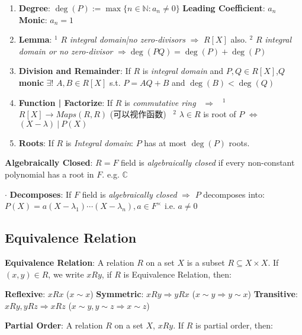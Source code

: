 \documentclass[9pt]{article}
\begin{document}
\begin{enumerate}[itemsep=-2pt, topsep=-2pt]
    \item \textbf{Degree}: $\deg(P):=\max\{n\in\mathbb{N}:a_n\ne0\}$ \quad \textbf{Leading Coefficient}: $a_n$ \quad \textbf{Monic}: $a_n=1$ \quad \quad {}
    \item \textbf{Lemma}: {\small $^1$ $R$ \textit{integral domain|no zero-divisors} $\Rightarrow$ $R[X]$ also. \qquad $^2$ $R$ \textit{integral domain or no zero-divisor} $\Rightarrow\deg(PQ)=\deg(P)+\deg(P)$}
    \item \textbf{Division and Remainder}: If $R$ is \textit{integral domain} and $P,Q\in R[X]$,{\scriptsize $Q$ \textbf{monic}} $\exists!$ $A,B\in R[X]$ s.t. $P=AQ+B$ and $\deg(B)<\deg(Q)$
    \item \textbf{Function | Factorize}: If $R$ is \textit{commutative ring} \ $\Rightarrow$ \ $^1$ $R[X]\to Maps(R,R)$ {\scriptsize (可以视作函数)} \ $^2$ $\lambda\in R$ is root of $P$ $\Leftrightarrow$ $(X-\lambda) \ | \ P(X)$
    \item \textbf{Roots}: If $R$ is \textit{Integral domain}: $P$ has at most $\deg(P)$ roots.
\end{enumerate}

\textbf{Algebraically Closed}: $R=F$ field is \textit{algebraically closed} if every non-constant polynomial has a root in $F$. \qquad \qquad e.g. $\mathbb{C}$

$\cdot$ \textbf{Decomposes}: If $F$ field is \textit{algebraically closed} $\Rightarrow$ $P$ decomposes into: $P(X)=a(X-\lambda_1)\cdots(X-\lambda_n),a\in F^\times$ {\scriptsize i.e. $a\ne0$}


\subsection{Equivalence Relation}

\textbf{Equivalence Relation}: A relation $R$ on a set $X$ is a subset $R\subseteq X\times X$. If $(x,y)\in R$, we write $xRy$, {\footnotesize if $R$ is Equivalence Relation, then:}

\quad \textbf{Reflexive}: $xRx$ {\scriptsize ($x\sim x$)} \quad \textbf{Symmetric}: $xRy\Rightarrow y Rx$ {\scriptsize ($x\sim y \Rightarrow y\sim x$)} \quad \textbf{Transitive}: $xRy,yRz\Rightarrow xRz$ {\scriptsize ($x\sim y,y\sim z\Rightarrow x\sim z$)}

\textbf{Partial Order}: A relation $R$ on a set $X$, $xRy$. {\footnotesize If $R$ is partial order, then:}
\end{document}
